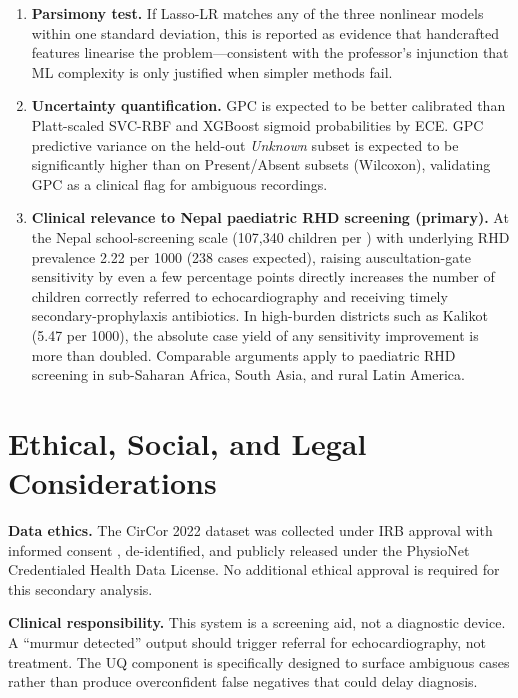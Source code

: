 \documentclass[10pt,twocolumn]{article}
\begin{document}
\begin{enumerate}
    \item \textbf{Parsimony test.} If Lasso-LR matches any of the three nonlinear models within one standard deviation, this is reported as evidence that handcrafted features linearise the problem---consistent with the professor's injunction that ML complexity is only justified when simpler methods fail.

    \item \textbf{Uncertainty quantification.} GPC is expected to be better calibrated than Platt-scaled SVC-RBF and XGBoost sigmoid probabilities by ECE. GPC predictive variance on the held-out \textit{Unknown} subset is expected to be significantly higher than on Present/Absent subsets (Wilcoxon), validating GPC as a clinical flag for ambiguous recordings.

    \item \textbf{Clinical relevance to Nepal paediatric RHD screening (primary).} At the Nepal school-screening scale (107{,}340 children per \citep{nepal_rhd2023}) with underlying RHD prevalence 2.22 per 1000 (238 cases expected), raising auscultation-gate sensitivity by even a few percentage points directly increases the number of children correctly referred to echocardiography and receiving timely secondary-prophylaxis antibiotics. In high-burden districts such as Kalikot (5.47 per 1000), the absolute case yield of any sensitivity improvement is more than doubled. Comparable arguments apply to paediatric RHD screening in sub-Saharan Africa, South Asia, and rural Latin America.
\end{enumerate}

\section{Ethical, Social, and Legal Considerations}

\textbf{Data ethics.} The CirCor 2022 dataset was collected under IRB approval with informed consent \citep{circor_data}, de-identified, and publicly released under the PhysioNet Credentialed Health Data License. No additional ethical approval is required for this secondary analysis.

\textbf{Clinical responsibility.} This system is a screening aid, not a diagnostic device. A ``murmur detected'' output should trigger referral for echocardiography, not treatment. The UQ component is specifically designed to surface ambiguous cases rather than produce overconfident false negatives that could delay diagnosis.
\end{document}

